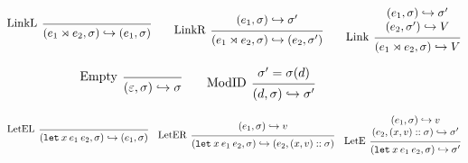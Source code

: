 \documentclass[acmsmall,screen,review]{acmart}\settopmatter{printfolios=true,printccs=false,printacmref=false}
\newcommand*{\cons}{::}
\newcommand*{\modid}{d}
\newcommand*{\ctx}{\sigma}
\newcommand*{\semarrow}{\hookrightarrow}
\newcommand*{\link}[2]{{#1}\rtimes{#2}}
\begin{document}
\begin{figure}[t!]
  \[
    \begin{prooftree}
      \infer[left label=LinkL]0{
      (\link{e_{1}}{e_{2}}, \ctx)
      \semarrow
      (e_{1}, \ctx)
      }
    \end{prooftree}\qquad
    \begin{prooftree}
      \hypo{
        \begin{matrix}
          (e_{1}, \ctx)
          \semarrow
          \ctx'
        \end{matrix}
      }
      \infer[left label=LinkR]1{
      (\link{e_{1}}{e_{2}}, \ctx)
      \semarrow
      (e_{2}, \ctx')
      }
    \end{prooftree}\qquad
    \begin{prooftree}
      \hypo{
        \begin{matrix}
          (e_{1}, \ctx)
          \semarrow
          \ctx' \\
          (e_{2}, \ctx')
          \semarrow
          V
        \end{matrix}
      }
      \infer[left label=Link]1{
      (\link{e_{1}}{e_{2}}, \ctx)
      \semarrow
      V
      }
    \end{prooftree}
  \]

  \[
    \begin{prooftree}
      \infer[left label=Empty]0{
      (\varepsilon, \ctx)
      \semarrow
      \ctx
      }
    \end{prooftree}\qquad
    \begin{prooftree}
      \hypo{\ctx'=\ctx(\modid)}
      \infer[left label=ModID]1{
      (\modid, \ctx)
      \semarrow
      \ctx'
      }
    \end{prooftree}
  \]

  \[
    \begin{prooftree}
      \infer[left label=LetEL]0{
      (\mathtt{let}\:x\:e_1\:e_2, \ctx)
      \semarrow
      (e_{1}, \ctx)
      }
    \end{prooftree}\quad
    \begin{prooftree}
      \hypo{
        \begin{matrix}
          (e_{1}, \ctx)
          \semarrow
          v
        \end{matrix}
      }
      \infer[left label=LetER]1{
      (\mathtt{let}\:x\:e_1\:e_2, \ctx)
      \semarrow
      (e_{2}, (x, v)\cons \ctx)
      }
    \end{prooftree}\quad
    \begin{prooftree}
      \hypo{
        \begin{matrix}
          (e_{1}, \ctx)
          \semarrow
          v \\
          (e_{2}, (x, v)\cons \ctx)
          \semarrow
          \ctx'
        \end{matrix}
      }
      \infer[left label=LetE]1{
      (\mathtt{let}\:x\:e_1\:e_2, \ctx)
      \semarrow
      \ctx'
      }
    \end{prooftree}
  \]


\end{figure}
\end{document}
